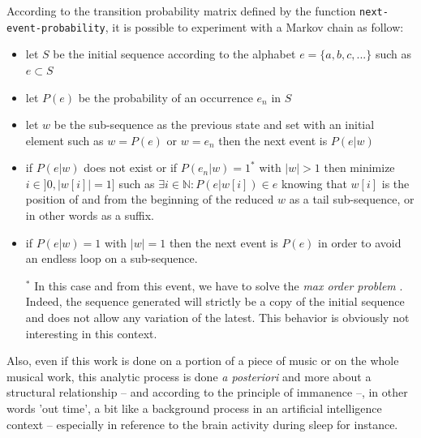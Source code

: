 \noindent
\begin{info}
\begin{minipage}{0.95\textwidth}
\vspace{0.25cm}
According to the transition probability matrix defined by the function \texttt{next-event-probability}, it is possible to experiment with a Markov chain as follow:
\begin{itemize}[leftmargin=0.45cm]
  \item let $S$ be the initial sequence according to the alphabet $e=\{a,b,c,...\}$ such as $e \subset S$
  \item let $P(e)$ be the probability of an occurrence $e_n$ in $S$
  \item let $w$ be the sub-sequence as the previous state and set with an initial element such as $w=P(e)$ or $w=e_n$ then the next event is $P(e|w)$
  \item if $P(e|w)$ does not exist or if $P(e_n|w)=1^*$ with $|w|>1$ then minimize $i \in ]0, |w[i]|=1]$ such as $\exists i \in \mathbb{N}:P(e|w[i]) \in e$ knowing that $w[i]$ is the position of and from the beginning of the reduced $w$ as a tail sub-sequence, or in other words as a suffix.
  \item if $P(e|w)=1$ with $|w|=1$ then the next event is $P(e)$ in order to avoid an endless loop on a sub-sequence. 
    \vspace{0.2cm}
\begin{spacing}{1.0}
\footnotesize $^*$ In this case and from this event, we have to solve the \textit{max order problem} \citep{mop}. Indeed, the sequence generated will strictly be a copy of the initial sequence and does not allow any variation of the latest. This behavior is obviously not interesting in this context.
\end{spacing}
\end{itemize}
\end{minipage}
\end{info}
\label{am:mc}

Also, even if this work is done on a portion of a piece of music or on the whole musical work, this analytic process is done \textit{a posteriori} and more about a structural relationship -- and according to the principle of immanence --, in other words 'out time', a bit like a background process in an artificial intelligence context -- especially in reference to the brain activity during sleep for instance.

